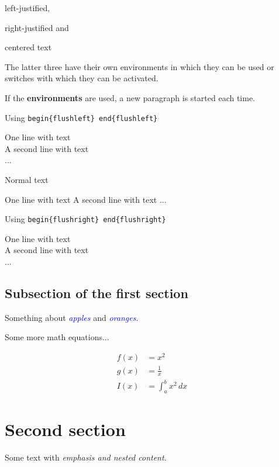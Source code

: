 \documentclass[12]{article}
\newcommand\kw[1]{\textcolor{blue}{\itshape #1}}
\begin{document}
    \textsf{left-justified},

    \textsf{right-justified} and

    \textsf{centered text}

    The latter three have their own environments in which they can be used or switches with which they can be activated.

    If the \textbf{environments} are used, a new paragraph is started each time.

    Using \verb|begin{flushleft} end{flushleft}|

    \begin{flushleft}
    One line with text \\
    A second line with text\\
    ... 
    \end{flushleft}

    Normal text

    One line with text
    A second line with text
    ...
    
    Using \verb|begin{flushright} end{flushright}|

    \begin{flushright}
    One line with text\\
    A second line with text \\
    ...
    \end{flushright}

    \subsection{Subsection of the first section}%
    \label{subsec:first-sub-section}
    
    Something about \kw{apples} and \kw{oranges}.

    Some more math equations...

    \begin{align}
        f(x) &= x^2\\
        g(x) &= \frac{1}{x}\\
        I(x) &= \int_{a}^{b} x^2 \,dx
    \end{align}

    \section{Second section}%
    \label{sec:second-section}
    
    Some text with \emph{emphasis and \emph{nested} content}.
\end{document}
